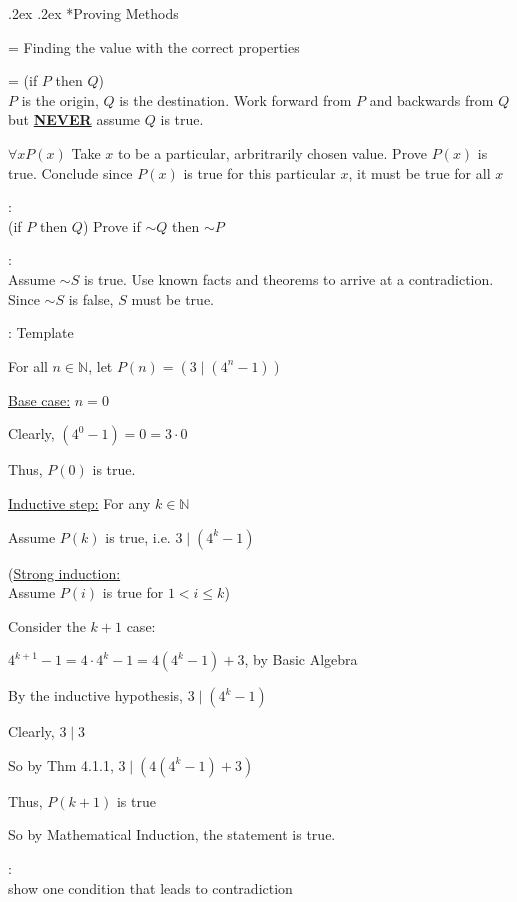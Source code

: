 \documentclass[10pt,landscape,a4paper]{article}
\makeatletter
\newenvironment{descitemize} %
{\begin{description}[leftmargin=*,before=\let\makelabel\descitemlabel]}
	{\end{description}}
\newcommand{\descitemlabel}[1]{%
	\textbullet\ \textbf{#1}%
}
\renewcommand{\subsection}{\@startsection{subsection}{1}{0mm}%
                                {.2ex}%
                                {.2ex}%
                                {\sffamily\bfseries}}
\makeatother
\begin{document}
\begin{multicols*}{4}
	\subsection*{Proving Methods}
	\begin{descitemize}
		\item [By construction] = Finding the value with the correct properties
		\item [If-then] = (if $P$ then $Q$) \\
		$P$ is the origin, $Q$ is the destination. Work forward from $P$ and backwards from $Q$ but \textbf{\underline{NEVER}} assume $Q$ is true.
		\item $\forall x P(x)$
		Take $x$ to be a particular, arbritrarily chosen value. Prove $P(x)$ is true. Conclude since $P(x)$ is true for this particular $x$, it must be true for all $x$
		\item [By contrapositive]: \\ (if $P$ then $Q$) Prove if $\sim Q$ then $\sim P$
		\item [By contradiction]: \\ Assume $\sim S$ is true. Use known facts and theorems to arrive at a contradiction. Since $\sim S$ is false, $S$ must be true.
		\item [By induction]: Template
		\begin{legal}
			\item For all $n \in \mathbb{N}$, let $P(n) = (3 \mid (4^n - 1))$
			\item \underline{Base case:} $n = 0$
			\begin{legal}
				\item Clearly, $(4^0 - 1) = 0 = 3 \cdot 0$
				\item Thus, $P(0)$ is true.
			\end{legal}
			\item \underline{Inductive step:} For any $k \in \mathbb{N}$
			\begin{legal}
				\item Assume $P(k)$ is true, i.e. $3 \mid (4^k - 1)$
				\item (\underline{Strong induction:}\\
				Assume $P(i)$ is true for $1 < i \leq k$)
				\item Consider the $k+1$ case:
				\item $4^{k+1} - 1 = 4 \cdot 4^k - 1 = 4(4^k - 1) + 3$, by Basic Algebra
				\item By the inductive hypothesis, $3 \mid (4^k - 1)$
				\item Clearly, $3 \mid 3$
				\item So by Thm 4.1.1, $3 \mid (4(4^k -1)+3)$
				\item Thus, $P(k+1)$ is true
			\end{legal}
			\item So by Mathematical Induction, the statement is true.
		\end{legal}
		\item [Disproving by counterexample]: \\ show one condition that leads to contradiction
	\end{descitemize}

\end{multicols*}
\end{document}

